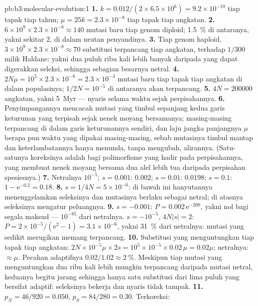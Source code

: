 \begin{solution}{pb:b3:molecular-evolution:1}
\textbf{1.} $k = 0.012/(2\times 6.5\times 10^{6}) = 9.2\times 10^{-10}$ tiap
tapak tiap tahun; $\mu = 25k = 2.3\times 10^{-8}$ tiap tapak tiap angkatan.
\textbf{2.} $6\times 10^{9}\times 2.3\times 10^{-8} \approx 140$ mutasi
baru tiap genom diploid; \qty{1.5}{\%} di antaranya, yakni sekitar $2$, di dalam
urutan penyandinya.
\textbf{3.} Tiap genom haploid, $3\times 10^{9}\times 2.3\times 10^{-8}
\approx 70$ substitusi terpancang tiap angkatan, terhadap $1/300$
milik Haldane: yakni dua puluh ribu kali lebih banyak daripada yang dapat digerakkan seleksi, sehingga
sebagian besarnya netral.
\textbf{4.} $2N\mu = 10^{5}\times 2.3\times 10^{-8} = 2.3\times 10^{-3}$
mutasi baru tiap tapak tiap angkatan di dalam populasinya; $1/2N =
10^{-5}$ di antaranya akan terpancang.
\textbf{5.} $4N = \num{200000}$ angkatan, yakni \qty{5}{Myr} --- nyaris
selama waktu sejak perpisahannya.
\textbf{6.} Penyimpangannya mencacah mutasi yang timbul sepanjang kedua
garis keturunan yang terpisah sejak nenek moyang bersamanya; masing-masing terpancang di dalam
garis keturunannya sendiri, dan laju jangka panjangnya $\mu$ berapa pun waktu yang dipakai
masing-masing, sebab mutasinya timbul mantap dan keterlambatannya hanya menunda, tanpa
mengubah, alirannya. (Satu-satunya koreksinya adalah bagi polimorfisme yang hadir pada
perpisahannya, yang membuat nenek moyang bersama dua alel lebih tua daripada
perpisahan spesiesnya.)
\textbf{7.} Netralnya $10^{-5}$; $s = 0.001$: $0.002$; $s = 0.01$: $0.0198$;
$s = 0.1$: $1 - \mathrm{e}^{-0.2} = 0.18$.
\textbf{8.} $s = 1/4N = 5\times 10^{-6}$: di bawah ini hanyutannya menenggelamkan
seleksinya dan mutasinya berlaku sebagai netral; di atasnya seleksinya
mengatur peluangnya.
\textbf{9.} $s = -0.001$: $P = 0.002\,\mathrm{e}^{-200}$, yakni nol bagi segala
maksud --- $10^{-85}$ dari netralnya. $s = -10^{-5}$, $4N|s| = 2$: $P =
2\times 10^{-5}/(\mathrm{e}^{2} - 1) = 3.1\times 10^{-6}$, yakni \qty{31}{\%} dari
netralnya: mutasi yang sedikit merugikan memang terpancang.
\textbf{10.} Substitusi yang menguntungkan tiap tapak tiap angkatan: $2N\times
10^{-5}\mu\times 2s = 10^{5}\times 10^{-5}\times 0.02\,\mu = 0.02\mu$;
netralnya: $\approx\mu$. Pecahan adaptifnya $0.02/1.02 \approx \qty{2}{\%}$.
Meskipun tiap mutasi yang menguntungkan dua ribu kali lebih mungkin terpancang
daripada mutasi netral, keduanya begitu jarang sehingga hanya satu substitusi dari
lima puluh yang bersifat adaptif: seleksinya bekerja dan nyaris tidak tampak.
\textbf{11.} $p_{N} = 46/920 = 0.050$, $p_{S} = 84/280 = 0.30$. Terkoreksi:

\end{solution}
